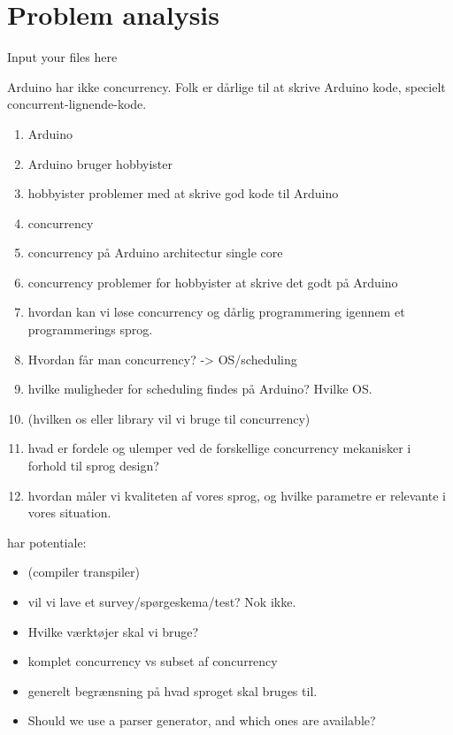 \chapter{Problem analysis}\label{cha:problemanalysis}
Input your files here

Arduino har ikke concurrency. Folk er dårlige til at skrive Arduino kode, specielt concurrent-lignende-kode.

\begin{enumerate}
    \item Arduino
        \item Arduino bruger hobbyister
        \item hobbyister problemer med at skrive god kode til Arduino
    \item concurrency
        \item concurrency på Arduino architectur single core
        \item concurrency problemer for hobbyister at skrive det godt på Arduino
    \item hvordan kan vi løse concurrency og dårlig programmering igennem et programmerings sprog.
        \item Hvordan får man concurrency? -> OS/scheduling
            \item hvilke muligheder for scheduling findes på Arduino? Hvilke OS.
            \item (hvilken os eller library vil vi bruge til concurrency)
        \item hvad er fordele og ulemper ved de forskellige concurrency mekanisker i forhold til sprog design?
        \item hvordan måler vi kvaliteten af vores sprog, og hvilke parametre er relevante i vores situation.
\end{enumerate}

har potentiale:
\begin{itemize}
    \item (compiler transpiler)
    
    \item vil vi lave et survey/spørgeskema/test? Nok ikke.
    
    \item Hvilke værktøjer skal vi bruge?
    
    \item komplet concurrency vs subset af concurrency
    \item generelt begrænsning på hvad sproget skal bruges til.
    \item Should we use a parser generator, and which ones are available?

\end{itemize}



